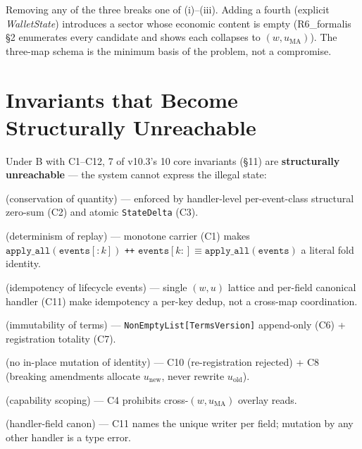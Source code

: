\documentclass[11pt,a4paper]{article}
\begin{document}
\noindent Removing any of the three breaks one of (i)--(iii). Adding a fourth (explicit \textit{WalletState}) introduces a sector whose economic content is empty (R6\_formalis \S 2 enumerates every candidate and shows each collapses to $(w, u_{\mathrm{MA}})$). The three-map schema is the minimum basis of the problem, not a compromise.

\section{Invariants that Become Structurally Unreachable}
\label{sec:unreachable}

Under B with C1--C12, 7 of v10.3's 10 core invariants (\S 11) are \textbf{structurally unreachable} --- the system cannot express the illegal state:

\begin{description}[leftmargin=3em,labelwidth=2em,labelsep=0.5em,style=nextline]
\item[\textbf{P1}] (conservation of quantity) --- enforced by handler-level per-event-class structural zero-sum (C2) and atomic \texttt{StateDelta} (C3).
\item[\textbf{P3}] (determinism of replay) --- monotone carrier (C1) makes $\texttt{apply\_all}(\texttt{events}[:k])$ \texttt{++} $\texttt{events}[k:] \equiv \texttt{apply\_all}(\texttt{events})$ a literal fold identity.
\item[\textbf{P5}] (idempotency of lifecycle events) --- single $(w, u)$ lattice and per-field canonical handler (C11) make idempotency a per-key dedup, not a cross-map coordination.
\item[\textbf{P6}] (immutability of terms) --- \texttt{NonEmptyList[TermsVersion]} append-only (C6) + registration totality (C7).
\item[\textbf{P7}] (no in-place mutation of identity) --- C10 (re-registration rejected) + C8 (breaking amendments allocate $u_{\mathrm{new}}$, never rewrite $u_{\mathrm{old}}$).
\item[\textbf{P9}] (capability scoping) --- C4 prohibits cross-$(w, u_{\mathrm{MA}})$ overlay reads.
\item[\textbf{P10}] (handler-field canon) --- C11 names the unique writer per field; mutation by any other handler is a type error.
\end{description}
\end{document}

